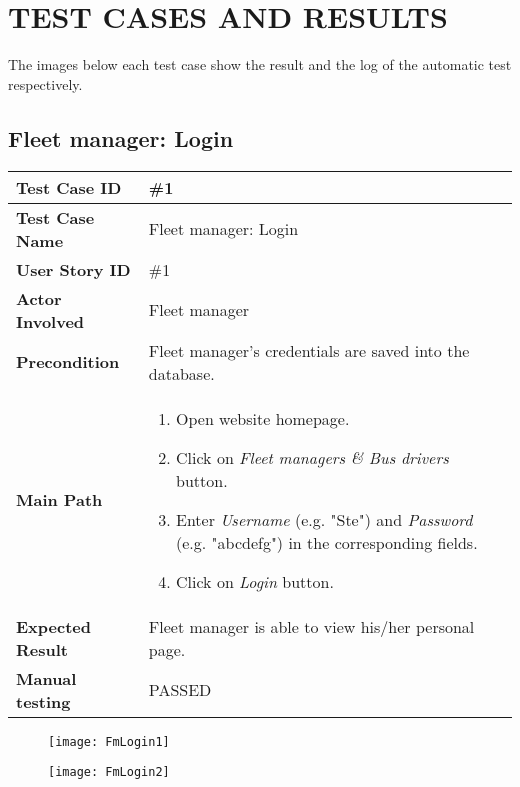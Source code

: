 \section{TEST CASES AND RESULTS}
The images below each test case show the result and the log of the automatic test respectively.
\subsection{Fleet manager: Login}
\begin{center}
	\begin{tabular} { | m{3.5cm} | m{9.5cm} | }
		\hline
		\textbf{Test Case ID} & \#1\\
		\hline
		\textbf{Test Case Name} & Fleet manager: Login\\
		\hline
		\textbf{User Story ID} & \#1\\
		\hline
		\textbf{Actor Involved} & Fleet manager\\
		\hline
		\textbf{Precondition} & Fleet manager's credentials are saved into the database.\\
		\hline
		\textbf{Main Path} & 
		\begin{enumerate}
			\item Open website homepage.
			\item Click on \textit{Fleet managers \& Bus drivers} button.
			\item Enter \textit{Username} (e.g. "Ste") and \textit{Password} (e.g. "abcdefg") in the corresponding fields.
			\item Click on \textit{Login} button.
		\end{enumerate}\\
		\hline
		\textbf{Expected Result} & Fleet manager is able to view his/her personal page.\\
		\hline
		\textbf{Manual testing} & PASSED\\
		\hline
	\end{tabular}
\end{center}

\begin{figure}[H]
	\centering
	\texttt{[image: FmLogin1]}
\end{figure}
\begin{figure}[H]
	\centering
	\texttt{[image: FmLogin2]}
\end{figure}
\newpage
